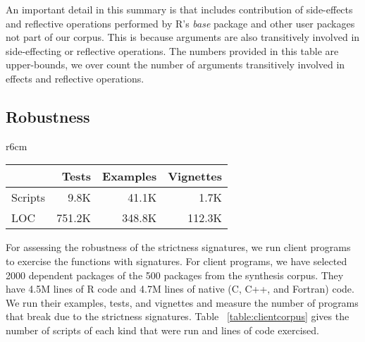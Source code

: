 \documentclass[review,nonacm,screen,acmsmall,anonymous=true]{acmart}
\newcommand{\authorcomment}[3]{}
\newcommand{\AG}[1]{\authorcomment{orange}{AG}{#1}}
\begin{document}
%
An important detail in this summary is that includes contribution of
side-effects and reflective operations performed by R's \emph{base} package and
other user packages not part of our corpus. This is because arguments are also
transitively involved in side-effecting or reflective operations. The numbers
provided in this table are upper-bounds, we over count the number of arguments
transitively involved in effects and reflective operations.

\subsection{Robustness} \label{Evaluation:Robustness}

\begin{wraptable}{r}{6cm}
  \vspace{-3mm}
  \small
  \centering
  \caption{Client Corpus}\label{table:clientcorpus}
  \vspace{-3mm}
  \begin{tabular}{lrrr}
    \toprule
    &\bf Tests&\bf Examples&\bf Vignettes\\
    \midrule
    {Scripts} &9.8K&41.1K&1.7K\\
    \midrule
    {LOC} &751.2K&348.8K&112.3K\\
    \bottomrule
  \end{tabular}
\end{wraptable}%


For assessing the robustness of the strictness signatures, we run client
programs to exercise the functions with signatures. For client programs, we have
selected 2000 dependent packages of the 500 packages from the synthesis corpus.
They have 4.5M lines of R code and 4.7M lines of native (C, C++, and Fortran)
code. We run their examples, tests, and vignettes and measure the number of
programs that break due to the strictness signatures. Table
~\ref{table:clientcorpus} gives the number of scripts of each kind that were run
and lines of code exercised.



\AG{add evaluation orders and contrast with side effects to assess impact.}
\end{document}
